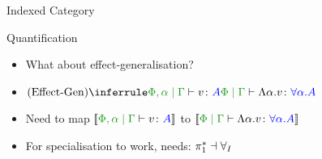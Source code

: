 \documentclass{beamer}
\newcommand\script[1]{}
\begin{document}
\begin{frame}{Indexed Category}


    \script{
        - So now we can construct this structure
        - called an index category
        - We have a functor mapping each object representing an effect-variable environment to the relevant S-category fibre.
        - Also contravariantly, meaning the direction of the morphism changes, maps morphisms in the base category to re-indexing functors between the relevant fibres.
        - So now we can perform substitutions and weakenings on the effect environment and get the right behaviour on the semantics of the EC instantiation
    }
    
\end{frame}

\begin{frame}{Quantification}
    \begin{itemize}\setlength\itemsep{2em}
        \item What about effect-generalisation?
        \item $\ntreeruleI{Effect-Gen}{\etyperelation{\P,\a}{\G}{v}{A}}{\etyperelation{\P}{\G}{\elam{\a}{v}}{\all{\a}{A}}}$
        \item Need to map $\deno{\etyperelation{\P,\a}{\G}{v}{A}}$ to $\deno{\etyperelation{\P}{\G}{\elam{\a}{v}}{\all{\a}{A}}}$
        \item For specialisation to work, needs: $\pi_1^*\dashv\forall_I$
    \end{itemize}


    
    \script{
        - We now need to think about the polymorphic terms
        - For quantification, we need another functor, $\allI$ which maps a type rule with an extra effect variable to one quantified over that variable
        - In order for specialisation to work, this quantification functor needs to be a right adjoint to the opposite operation of weakening the effect environment
        - Adjunction of functors is essentially a weaker version of an isomorphism of the categories they're between.
        - Going out on one functor and coming back on the other isn't quite the same as the identity, but it has a well defined action.
    }

\end{frame}
    
\end{document}
